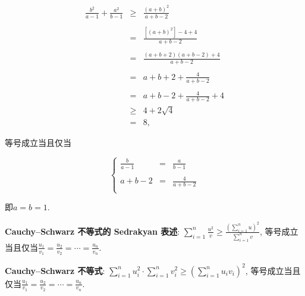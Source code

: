 \documentclass[8pt]{article}
\begin{document}
\begin{enumerate}[label=(\arabic*)]
				$$
				\begin{array}{rcl}
					\displaystyle \frac{b^2}{a-1} + \frac{a^2}{b-1}&\geq&\displaystyle \frac{(a+b)^2}{a+b-2}\\\\
					&=&\displaystyle \frac{[(a+b)^2]-4+4}{a+b-2}\\\\
					&=&\displaystyle \frac{(a+b+2)(a+b-2)+4}{a+b-2}\\\\
					&=&\displaystyle a+b+2+\frac{4}{a+b-2}\\\\
					&=&\displaystyle a+b-2+\frac{4}{a+b-2} + 4\\
					&\geq&\displaystyle 4+2\sqrt{4}\\
					&=&8,
				\end{array}
				$$

				等号成立当且仅当

				$$
				\left\{
				\begin{array}{rcl}
					\displaystyle \frac{b}{a-1}&=&\displaystyle \frac{a}{b-1}\\\\
					a+b-2&=&\displaystyle \frac{4}{a+b-2}\\
				\end{array}
				\right.
				$$

				即$a=b=1$.

				\textbf{Cauchy–Schwarz 不等式的 Sedrakyan 表述}: $\displaystyle \sum_{i=1}^{n}{\frac{u^2}{v}}\geq\frac{\left(\sum_{i=1}^{n}{u}\right)^2}{\sum_{i=1}^{n}{v}}$, 等号成立当且仅当$\displaystyle \frac{u_1}{v_1}=\frac{u_2}{v_2}=\cdots=\frac{u_n}{v_n}.$

				\textbf{Cauchy–Schwarz 不等式}: $\displaystyle \sum_{i=1}^{n} u_i^2 \cdot \sum_{i=1}^{n} v_i^2 \geq \left(\sum_{i=1}^{n}u_i v_i\right)^2$, 等号成立当且仅当$\displaystyle \frac{u_1}{v_1}=\frac{u_2}{v_2}=\cdots=\frac{u_n}{v_n}.$

	\end{enumerate}
\end{document}
